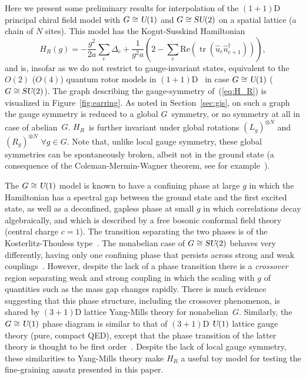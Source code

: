 \documentclass[twocolumn,lengthcheck,superscriptaddress]{revtex4-1}
\newcommand{\tr}{\operatorname{tr}}
\def\su2{\textsl{SU}(2)}
\def\uone{\textsl{U}(1)}
\theoremstyle{definition}
\theoremstyle{remark}
\begin{document}
Here we present some preliminary results for interpolation of the $(1+1)$D principal chiral field model with $G \cong \uone$ and $G \cong \su2$ on a spatial lattice (a chain of $N$ sites). This model has the Kogut-Susskind Hamiltonian
\begin{equation} \label{eq:H_R}
	H_R(g) = -\frac{g^2}{2 a} \sum_e \Delta_e + \frac{1}{g^2 a}\left( 2 - \sum_e \text{Re}(\tr (\widehat{u}_e \widehat{u}_{e+1}^\dagger)) \right),
\end{equation}
and is, insofar as we do not restrict to gauge-invariant states, equivalent to the $O(2)$ ($O(4)$) quantum rotor models in $(1+1)$D~\cite{sachdev:2011a} in case $G \cong \uone$ ($G \cong \su2$). The graph describing the gauge-symmetry of~(\ref{eq:H_R}) is visualized in Figure~\ref{fig:earring}.  As noted in Section~\ref{sec:gis}, on such a graph the gauge symmetry is reduced to a global $G$~symmetry, or no symmetry at all in case of abelian~$G$. $H_R$~is further invariant under global rotations $(L_g)^{\otimes N}$ and $(R_g)^{\otimes N}$ $\forall g \in G$. Note that, unlike local gauge symmetry, these global symmetries can be spontaneously broken, albeit not in the ground state (a consequence of the Coleman-Mermin-Wagner theorem, see for example~\cite{peskin:1995a}).

The $G \cong \uone$ model is known to have a confining phase at large $g$ in which the Hamiltonian has a spectral gap between the ground state and the first excited state, as well as a deconfined, gapless phase at small $g$ in which correlations decay algebraically, and which is described by a free bosonic conformal field theory (central charge $c=1$). The transition separating the two phases is of the Kosterlitz-Thouless type~\cite{sachdev:2011a}. The nonabelian case of $G \cong \su2$ behaves very differently, having only one confining phase that persists across strong and weak couplings~\cite{sachdev:2011a}. However, despite the lack of a phase transition there is a \emph{crossover} region separating weak and strong coupling in which the scaling with $g$ of quantities such as the mass gap changes rapidly. There is much evidence~\cite{creutz:1985a} suggesting that this phase structure, including the crossover phenomenon, is shared by $(3+1)$D lattice Yang-Mills theory for nonabelian~$G$. Similarly, the $G \cong \uone$ phase diagram is similar to that of $(3+1)$D $\uone$ lattice gauge theory (pure, compact QED), except that the phase transition of the latter theory is thought to be first order~\cite{arnold:2003a}. Despite the lack of local gauge symmetry, these similarities to Yang-Mills theory make $H_R$ a useful toy model for testing the fine-graining ansatz presented in this paper.
\end{document}

